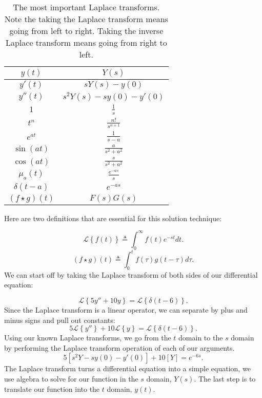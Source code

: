 \documentclass[a4paper,12pt]{article} %
\begin{document}
\begin{table}[ht!]
\begin{center}
\renewcommand{\arraystretch}{1.3}
\begin{tabular}{| c | c |}
\hline
$y(t)$ & $Y(s)$ \\
\hline
$y'(t)$ & $sY(s) - y(0)$ \\
\hline
$y''(t)$ & $s^2Y(s) - sy(0) - y'(0)$ \\
\hline
$1$ & $\displaystyle\frac{1}{s}$ \\
\hline
$t^n$ & $\displaystyle\frac{n!}{s^{n+1}}$ \\
\hline
$e^{at}$ & $\displaystyle\frac{1}{s-a}$ \\
\hline
$\sin{(at)}$ & $\displaystyle\frac{a}{s^2 + a^2}$ \\
\hline
$\cos{(at)}$ & $\displaystyle\frac{s}{s^2 + a^2}$ \\
\hline
$\mu_{a}(t)$ & $\displaystyle\frac{e^{-as}}{s}$ \\
\hline
$\delta(t-a)$ & $e^{-as}$ \\
\hline
$(f \star g)(t)$ & $F(s)G(s)$ \\
\hline
\end{tabular}
\end{center}
\caption{The most important Laplace transforms. Note the taking the Laplace transform means going from left to right. Taking the inverse Laplace transform means going from right to left.}
\label{table}
\end{table}

 Here are two definitions that are essential for this solution technique:
 
\begin{equation}
  \mathcal{L}\left\{f(t)\right\} \triangleq \int_{0}^{\infty}f(t)e^{-st}dt.
\end{equation}
\begin{equation}
	(f\star g)(t) \triangleq \int_{0}^{t}f(\tau)g(t-\tau)d\tau. \label{convolution}
\end{equation}
We can start off by taking the Laplace transform of both sides of our differential equation:

$$ \mathcal{L}\left\{5y'' + 10y\right\} = \mathcal{L}\left\{\delta(t-6)\right\}. $$
Since the Laplace transform is a linear operator, we can separate by plus and minus signs and pull out constants:
$$ 5\mathcal{L}\left\{y''\right\} + 10\mathcal{L}\left\{y\right\} = \mathcal{L}\left\{\delta(t-6)\right\}. $$
Using our known Laplace transforms, we go from the $t$ domain to the $s$ domain by performing the Laplace transform operation of each of our arguments.
$$ 5[s^2Y - sy(0) - y'(0)] + 10[Y] = e^{-6s}. $$
The Laplace transform turns a differential equation into a simple equation, we use algebra to solve for our function in the $s$ domain, $Y(s)$. The last step is to translate our function into the $t$ domain, $y(t)$.\\
\end{document}
